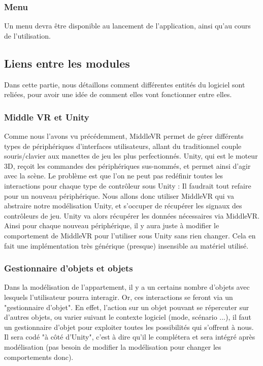 		\subsubsection{Menu}
			Un menu devra être disponible au lancement de l'application, ainsi qu'au cours de l'utilisation.

%
%
\subsection{Liens entre les modules}
Dans cette partie, nous détaillons comment différentes entités du logiciel sont reliées, pour avoir une idée de comment elles vont fonctionner entre elles.

\subsubsection{Middle VR et Unity}
Comme nous l'avons vu précédemment, MiddleVR permet de gérer différents types de périphériques d'interfaces utilisateurs, allant du traditionnel couple souris/clavier aux manettes de jeu les plus perfectionnés. 
Unity, qui est le moteur 3D, reçoit les commandes des périphériques sus-nommés, et permet ainsi d'agir avec la scène. 
Le problème est que l'on ne peut pas redéfinir toutes les interactions pour chaque type de contrôleur sous Unity : Il faudrait tout refaire pour un nouveau périphérique. 
Nous allons donc utiliser MiddleVR qui va abstraire notre modélisation Unity, et s'occuper de récupérer les signaux des contrôleurs de jeu. Unity va alors récupérer les données nécessaires via MiddleVR. 
Ainsi pour chaque nouveau périphérique, il y aura juste à modifier le comportement de MiddleVR pour l'utiliser sous Unity sans rien changer. 
Cela en fait une implémentation très générique (presque) insensible au matériel utilisé.


\subsubsection{Gestionnaire d'objets et objets}

Dans la modélisation de l'appartement, il y a un certains nombre d'objets avec lesquels l'utilisateur pourra interagir. 
Or, ces interactions se feront via un "gestionnaire d'objet". 
En effet, l'action sur un objet pouvant se répercuter sur d'autres objets, ou varier suivant le contexte logiciel (mode, scénario ...), il faut un gestionnaire d'objet pour exploiter toutes les possibilités qui s'offrent à nous. 
Il sera codé "à côté d'Unity", c'est à dire qu'il le complétera et sera intégré après modélisation (pas besoin de modifier la modélisation pour changer les comportements donc).

